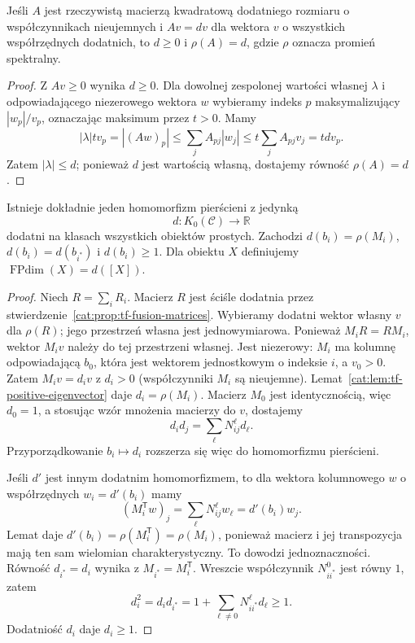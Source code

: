 \begin{lemat}\label{cat:lem:tf-positive-eigenvector}
Jeśli $A$ jest rzeczywistą macierzą kwadratową dodatniego rozmiaru o współczynnikach nieujemnych i $Av=dv$ dla wektora $v$ o wszystkich współrzędnych dodatnich, to $d\geq0$ i $\rho(A)=d$, gdzie $\rho$ oznacza promień spektralny.
\end{lemat}
\begin{proof}
Z $Av\geq0$ wynika $d\geq0$. Dla dowolnej zespolonej wartości własnej $\lambda$ i odpowiadającego niezerowego wektora $w$ wybieramy indeks $p$ maksymalizujący $|w_p|/v_p$, oznaczając maksimum przez $t>0$. Mamy
\[
 |\lambda|t v_p
 =|(Aw)_p|
 \leq\sum_j A_{pj}|w_j|
 \leq t\sum_j A_{pj}v_j=tdv_p.
\]
Zatem $|\lambda|\leq d$; ponieważ $d$ jest wartością własną, dostajemy równość $\rho(A)=d$.
\end{proof}

\begin{twierdzenie}\label{cat:thm:tf-fpdim}
Istnieje dokładnie jeden homomorfizm pierścieni z jedynką
\[
 d:K_0(\mathcal C)\longrightarrow\mathbb R
\]
dodatni na klasach wszystkich obiektów prostych. Zachodzi $d(b_i)=\rho(M_i)$, $d(b_i)=d(b_{i^*})$ i $d(b_i)\geq1$. Dla obiektu $X$ definiujemy $\operatorname{FPdim}(X)=d([X])$.
\end{twierdzenie}
\begin{proof}
Niech $R=\sum_iR_i$. Macierz $R$ jest ściśle dodatnia przez stwierdzenie~\ref{cat:prop:tf-fusion-matrices}. Wybieramy dodatni wektor własny $v$ dla $\rho(R)$; jego przestrzeń własna jest jednowymiarowa. Ponieważ $M_iR=RM_i$, wektor $M_iv$ należy do tej przestrzeni własnej. Jest niezerowy: $M_i$ ma kolumnę odpowiadającą $b_0$, która jest wektorem jednostkowym o indeksie $i$, a $v_0>0$. Zatem $M_iv=d_iv$ z $d_i>0$ (współczynniki $M_i$ są nieujemne). Lemat~\ref{cat:lem:tf-positive-eigenvector} daje $d_i=\rho(M_i)$. Macierz $M_0$ jest identycznością, więc $d_0=1$, a stosując wzór mnożenia macierzy do $v$, dostajemy
\[
 d_id_j=\sum_\ell N_{ij}^{\ell}d_\ell.
\]
Przyporządkowanie $b_i\mapsto d_i$ rozszerza się więc do homomorfizmu pierścieni.

Jeśli $d'$ jest innym dodatnim homomorfizmem, to dla wektora kolumnowego $w$ o współrzędnych $w_i=d'(b_i)$ mamy
\[
 (M_i^{\mathsf T}w)_j=\sum_\ell N_{ij}^{\ell}w_\ell=d'(b_i)w_j.
\]
Lemat daje $d'(b_i)=\rho(M_i^{\mathsf T})=\rho(M_i)$, ponieważ macierz i jej transpozycja mają ten sam wielomian charakterystyczny. To dowodzi jednoznaczności. Równość $d_{i^*}=d_i$ wynika z $M_{i^*}=M_i^{\mathsf T}$. Wreszcie współczynnik $N_{ii^*}^0$ jest równy $1$, zatem
\[
 d_i^2=d_i d_{i^*}=1+\sum_{\ell\neq0}N_{ii^*}^{\ell}d_\ell\geq1.
\]
Dodatniość $d_i$ daje $d_i\geq1$.
\end{proof}

